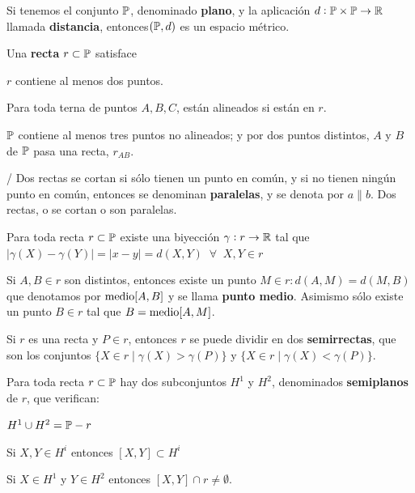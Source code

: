 	 Si tenemos el conjunto $\P$, denominado \textbf{plano}, y la aplicación $d:\P \times \P \rightarrow \R$ llamada \textbf{distancia}, entonces$(\P, d)$ es un espacio métrico.

 Una \textbf{recta} $r \subset \P$ satisface
\begin{itemizex}
	\item $r$ contiene al menos dos puntos.
	\item Para toda terna de puntos $A, B, C$, están alineados si están en $r$.
\end{itemizex}

 $\P$ contiene al menos tres puntos no alineados; y por dos puntos distintos, $A$ y $B$ de $\P$ pasa una recta, $r_{AB}$.

 /  Dos rectas se cortan si sólo tienen un punto en común, y si no tienen ningún punto en común, entonces se denominan \textbf{paralelas}, y se denota por $a \parallel b$. Dos rectas, o se cortan o son paralelas.

 Para toda recta $r \subset \P$ existe una biyección $\gamma: r \rightarrow \R$ tal que $|\gamma(X) - \gamma(Y)| = |x - y| = d(X, Y) \;\; \forall \;\; X,Y \in r$ 

 Si $A, B \in r$ son distintos, entonces existe un punto $M\in r: d(A,M) = d(M,B)$ que denotamos por $\m[A,B]$ y se llama \textbf{punto medio}. Asimismo sólo existe un punto $B \in r$ tal que $B = \m[A, M]$.

\obligatorio {}

 Si $r$ es una recta y $P \in r$, entonces $r$ se puede dividir en dos \textbf{semirrectas}, que son los conjuntos $\{X \in r \; | \; \gamma(X) > \gamma(P)\}$ y $\{X \in r \; | \; \gamma(X) < \gamma(P)\}$.

 Para toda recta $r \subset \P$ hay dos subconjuntos $H^1$ y $H^2$, denominados \textbf{semiplanos} de $r$, que verifican:
\begin{itemizex}
	\item $H^1 \cup H^2 = \P-r$
	\item Si $X,Y \in H^i$ entonces $[X,Y] \subset H^i$
	\item Si $X \in H^1$ y $Y \in H^2$ entonces $[X,Y] \cap r \neq \emptyset$.
\end{itemizex}

